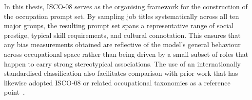 In this thesis, ISCO-08 serves as the organising framework for the construction of the
occupation prompt set.  By sampling job titles systematically across all ten major groups, the
resulting prompt set spans a representative range of social prestige, typical skill
requirements, and cultural connotation.  This ensures that any bias measurements obtained are
reflective of the model's general behaviour across occupational space rather than being driven
by a small subset of roles that happen to carry strong stereotypical associations.  The use of
an internationally standardised classification also facilitates comparison with prior work that
has likewise adopted ISCO-08 or related occupational taxonomies as a reference
point~\cite{Naik_2023_SocialBiasesThroughTheTextToImageGenerationLens}.
%
%
